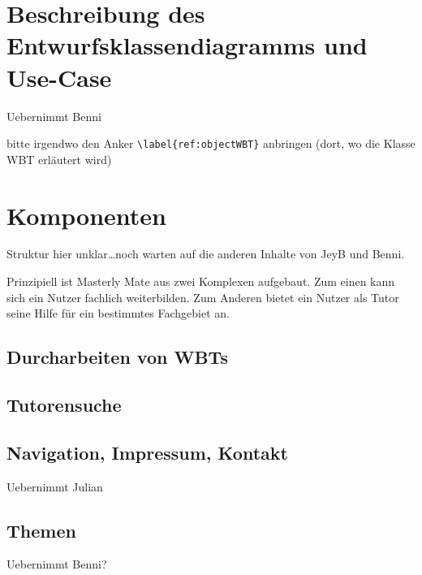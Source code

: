 \section{Beschreibung des Entwurfsklassendiagramms und
Use-Case}\label{ref:classModel}
\begin{k}
Uebernimmt Benni

bitte irgendwo den Anker \verb+\label{ref:objectWBT}+\label{ref:objectWBT}
anbringen (dort, wo die Klasse WBT erläutert wird)
\end{k}

\section{Komponenten}
\begin{k}
Struktur hier unklar\ldots noch warten auf die anderen Inhalte von JeyB und
Benni.
\end{k}
Prinzipiell ist Masterly Mate aus zwei Komplexen aufgebaut. Zum einen kann sich
ein Nutzer fachlich weiterbilden. Zum Anderen bietet ein Nutzer als Tutor seine
Hilfe für ein bestimmtes Fachgebiet an.

\subsection{Durcharbeiten von WBTs}

\subsection{Tutorensuche}

\subsection{Navigation, Impressum, Kontakt}
\begin{k}
Uebernimmt Julian
\end{k}

\subsection{Themen}
\begin{k}
Uebernimmt Benni?
\end{k}